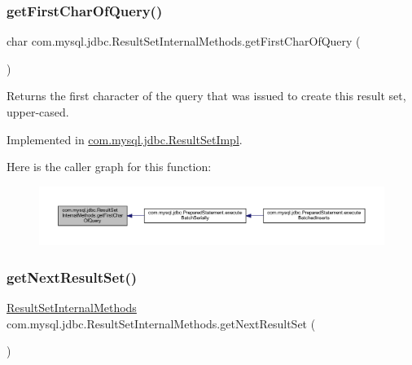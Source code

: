 \subsubsection{\texorpdfstring{get\+First\+Char\+Of\+Query()}{getFirstCharOfQuery()}}
{\footnotesize\ttfamily char com.\+mysql.\+jdbc.\+Result\+Set\+Internal\+Methods.\+get\+First\+Char\+Of\+Query (\begin{DoxyParamCaption}{ }\end{DoxyParamCaption})}

Returns the first character of the query that was issued to create this result set, upper-\/cased. 

Implemented in \mbox{\hyperlink{classcom_1_1mysql_1_1jdbc_1_1_result_set_impl_a89ddba59e7cbed718934f80f443f69f8}{com.\+mysql.\+jdbc.\+Result\+Set\+Impl}}.

Here is the caller graph for this function\+:
\nopagebreak
\begin{figure}[H]
\begin{center}
\leavevmode
\includegraphics[width=350pt]{interfacecom_1_1mysql_1_1jdbc_1_1_result_set_internal_methods_ad7091c487cd2a0ad8550ed98e489e535_icgraph}
\end{center}
\end{figure}
\mbox{\label{interfacecom_1_1mysql_1_1jdbc_1_1_result_set_internal_methods_a6e4a07c50830687cccf98fb12bdd3e37}} 
\subsubsection{\texorpdfstring{get\+Next\+Result\+Set()}{getNextResultSet()}}
{\footnotesize\ttfamily \mbox{\hyperlink{interfacecom_1_1mysql_1_1jdbc_1_1_result_set_internal_methods}{Result\+Set\+Internal\+Methods}} com.\+mysql.\+jdbc.\+Result\+Set\+Internal\+Methods.\+get\+Next\+Result\+Set (\begin{DoxyParamCaption}{ }\end{DoxyParamCaption})}

